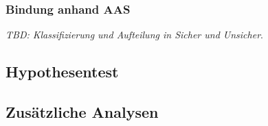 \subsubsection{Bindung anhand AAS}
\textit{TBD: Klassifizierung und Aufteilung in Sicher und Unsicher}.

\subsection{Hypothesentest} \label{sec:Hypothesentest}

\subsection{Zusätzliche Analysen} \label{sec:ZusätzlicheAnalysen}